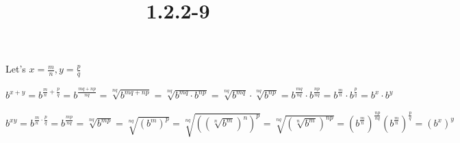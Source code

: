 \documentclass{article}
\title{1.2.2-9}
\begin{document}
\maketitle

Let's \( x = \frac{m}{n}, y = \frac{p}{q} \)

\( b^{x+y}=b^{\frac{m}{n} + \frac{p}{q}} = b^{\frac{mq+np}{nq}} = \sqrt[nq]{b^{mq+np}} = \sqrt[nq]{b^{mq} \cdot b^{np}} = \sqrt[nq]{b^{mq}} \cdot \sqrt[nq]{b^{np}} = b^{\frac{mq}{nq}} \cdot b^{\frac{np}{nq}} = b^{\frac{m}{n}} \cdot b^{\frac{p}{q}} = b^x \cdot b^y \)

\( b^{xy} = b^{\frac{m}{n}\cdot\frac{p}{q}} = b^{\frac{mp}{nq}} = \sqrt[nq]{b^{mp}} = \sqrt[nq]{(b^{m})^p} = \sqrt[nq]{((\sqrt[n]{b^m})^n)^{p}} = \sqrt[nq]{(\sqrt[n]{b^m})^{np}} = (b^{\frac{m}{n}})^{\frac{np}{nq}} (b^{\frac{m}{n}})^{\frac{p}{q}} = (b^x)^y \)
\end{document}
